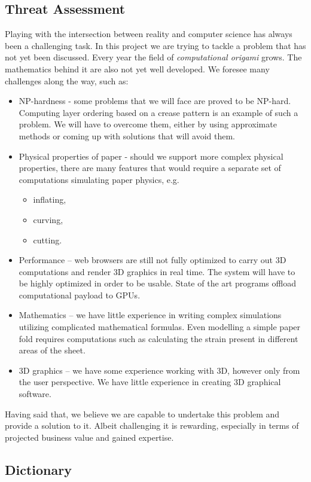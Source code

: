 \subsection{Threat Assessment}

Playing with the intersection between reality and computer science has always
been a challenging task.
In this project we are trying to tackle a problem that has not yet been discussed.
Every year the field of \textit{computational origami} grows. The mathematics behind it are also not yet well developed.
We foresee many challenges along the way, such as:

\begin{itemize}
	\item NP-hardness - some problems that we will face are proved to be NP-hard.
		Computing layer ordering based on a crease pattern is an example of such a problem.
		We will have to overcome them, either by using approximate methods or coming up with solutions that will avoid them.

	\item Physical properties of paper - should we support more complex physical properties,
		there are many features that would require a separate set of computations simulating paper physics, e.g.
		\begin{itemize}
			\item inflating,
			\item curving,
			\item cutting.
		\end{itemize}

	\item Performance -- web browsers are still not fully optimized to carry out 3D computations and render 3D graphics in real time.
		The system will have to be highly optimized in order to be usable.
		State of the art programs offload computational payload to GPUs.

	\item Mathematics -- we have little experience in writing complex simulations utilizing complicated mathematical formulas.
		Even modelling a simple paper fold requires computations such as calculating the strain present in different areas of the sheet.

	\item 3D graphics -- we have some experience working with 3D, however only from the user perspective.
		We have little experience in creating 3D graphical software.

\end{itemize}

Having said that, we believe we are capable to undertake this problem and provide a solution to it.
Albeit challenging it is rewarding, especially in terms of projected business value and gained expertise.


\subsection{Dictionary} \label{dictionary}



